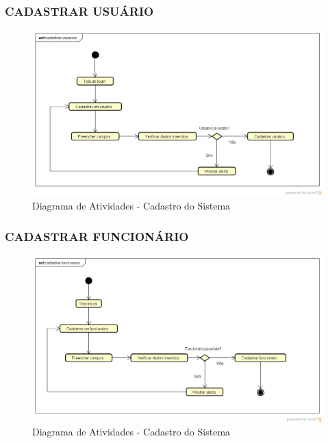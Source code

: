 \subsubsection{CADASTRAR USUÁRIO}
\begin{figure}[htb]
	\caption{\label{fig_cadastro} Diagrama de Atividades - Cadastro do Sistema}
	\begin{center}
	    \includegraphics[width=0.8\linewidth]{imagens/usuarios.png}
	\end{center}
\end{figure}

\newpage

\subsubsection{CADASTRAR FUNCIONÁRIO}
\begin{figure}[htb]
	\caption{\label{fig_cadastro} Diagrama de Atividades - Cadastro do Sistema}
	\begin{center}
	    \includegraphics[width=0.8\linewidth]{imagens/funcionario.png}
	\end{center}
\end{figure}

